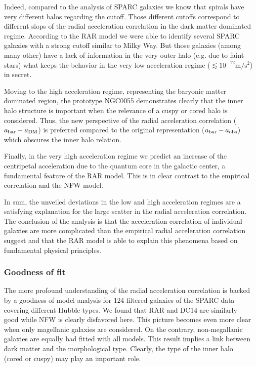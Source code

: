 Indeed, compared to the analysis of SPARC galaxies we know that spirals have very different halos regarding the cutoff. Those different cutoffs correspond to different slops of the radial acceleration correlation in the dark matter dominated regime. According to the RAR model we were able to identify several SPARC galaxies with a strong cutoff similar to Milky Way. But those galaxies (among many other) have a lack of information in the very outer halo (e.g. due to faint stars) what keeps the behavior in the very low acceleration regime ($\lesssim 10^{-12} \mathrm{m/s^2}$) in secret.

Moving to the high acceleration regime, representing the baryonic matter dominated region, the prototype NGC0055 demonstrates clearly that the inner halo structure is important when the relevance of a cuspy or cored halo is considered. Thus, the new perspective of the radial acceleration correlation ($a_\mathrm{bar}-a_\mathrm{DM}$) is preferred compared to the original representation ($a_\mathrm{bar}-a_\mathrm{obs}$) which obscures the inner halo relation.

Finally, in the very high acceleration regime we predict an increase of the centripetal acceleration due to the quantum core in the galactic center, a fundamental feature of the RAR model. This is in clear contrast to the empirical correlation and the NFW model.

In sum, the unveiled deviations in the low and high acceleration regimes are a satisfying explanation for the large scatter in the radial acceleration correlation. The conclusion of the analysis is that the acceleration correlation of individual galaxies are more complicated than the empirical radial acceleration correlation suggest and that the RAR model is able to explain this phenomena based on fundamental physical principles.

\subsubsection*{Goodness of fit}
The more profound understanding of the radial acceleration correlation is backed by a goodness of model analysis for 124 filtered galaxies of the SPARC data covering different Hubble types. We found that RAR and DC14 are similarly good while NFW is clearly disfavored here. This picture becomes even more clear when only magellanic galaxies are considered. On the contrary, non-megallanic galaxies are equally bad fitted with all models. This result implies a link between dark matter and the morphological type. Clearly, the type of the inner halo (cored or cuspy) may play an important role.

